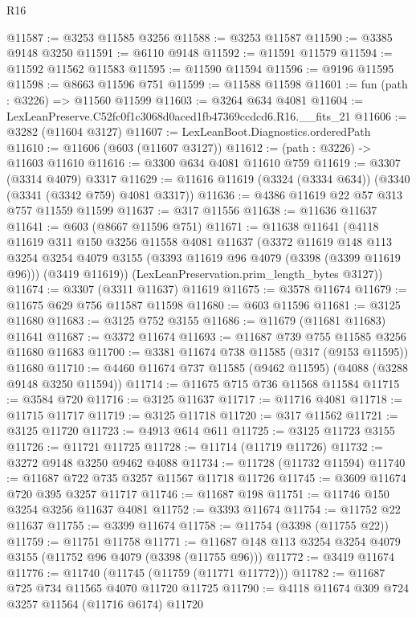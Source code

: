 \begin{lexlean}{R16}
\begin{coremodule}
@11587 := @3253 @11585 @3256
@11588 := @3253 @11587
@11590 := @3385 @9148 @3250
@11591 := @6110 @9148
@11592 := @11591 @11579
@11594 := @11592 @11562 @11583
@11595 := @11590 @11594
@11596 := @9196 @11595
@11598 := @8663 @11596 @751
@11599 := @11588 @11598
@11601 := fun (path : @3226) => @11560 @11599
@11603 := @3264 @634 @4081
@11604 := LexLeanPreserve.C52fc0f1c3068d0aced1fb47369ccdcd6.R16.__fits_21
@11606 := @3282 (@11604 @3127)
@11607 := LexLeanBoot.Diagnostics.orderedPath
@11610 := @11606 (@603 (@11607 @3127))
@11612 := (path : @3226) -> @11603 @11610
@11616 := @3300 @634 @4081 @11610 @759
@11619 := @3307 (@3314 @4079) @3317
@11629 := @11616 @11619 (@3324 (@3334 @634)) (@3340 (@3341 (@3342 @759) @4081 @3317))
@11636 := @4386 @11619 @22 @57 @313 @757 @11559 @11599
@11637 := @317 @11556
@11638 := @11636 @11637
@11641 := @603 (@8667 @11596 @751)
@11671 := @11638
    @11641
    (@4118
      @11619
      @311
      @150
      @3256
      @11558
      @4081
      @11637
      (@3372
        @11619
        @148
        @113
        @3254
        @3254
        @4079
        @3155
        (@3393 @11619 @96 @4079 (@3398 (@3399 @11619 @96)))
        (@3419 @11619))
      (LexLeanPreservation.prim_length_bytes @3127))
@11674 := @3307 (@3311 @11637) @11619
@11675 := @3578 @11674
@11679 := @11675 @629 @756 @11587 @11598
@11680 := @603 @11596
@11681 := @3125 @11680
@11683 := @3125 @752 @3155
@11686 := @11679 (@11681 @11683) @11641
@11687 := @3372 @11674
@11693 := @11687 @739 @755 @11585 @3256 @11680 @11683
@11700 := @3381 @11674 @738 @11585 (@317 (@9153 @11595)) @11680
@11710 := @4460 @11674 @737 @11585 (@9462 @11595) (@4088 (@3288 @9148 @3250 @11594))
@11714 := @11675 @715 @736 @11568 @11584
@11715 := @3584 @720
@11716 := @3125 @11637
@11717 := @11716 @4081
@11718 := @11715 @11717
@11719 := @3125 @11718
@11720 := @317 @11562
@11721 := @3125 @11720
@11723 := @4913 @614 @611
@11725 := @3125 @11723 @3155
@11726 := @11721 @11725
@11728 := @11714 (@11719 @11726)
@11732 := @3272 @9148 @3250 @9462 @4088
@11734 := @11728 (@11732 @11594)
@11740 := @11687 @722 @735 @3257 @11567 @11718 @11726
@11745 := @3609 @11674 @720 @395 @3257 @11717
@11746 := @11687 @198
@11751 := @11746 @150 @3254 @3256 @11637 @4081
@11752 := @3393 @11674
@11754 := @11752 @22 @11637
@11755 := @3399 @11674
@11758 := @11754 (@3398 (@11755 @22))
@11759 := @11751 @11758
@11771 := @11687 @148 @113 @3254 @3254 @4079 @3155 (@11752 @96 @4079 (@3398 (@11755 @96)))
@11772 := @3419 @11674
@11776 := @11740 (@11745 (@11759 (@11771 @11772)))
@11782 := @11687 @725 @734 @11565 @4070 @11720 @11725
@11790 := @4118 @11674 @309 @724 @3257 @11564 (@11716 @6174) @11720

\end{coremodule}
\end{lexlean}
